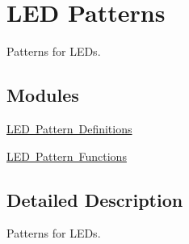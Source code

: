 \hypertarget{group___s_d___l_e_d___pattern}{}\section{L\+ED Patterns}
\label{group___s_d___l_e_d___pattern}


Patterns for L\+E\+Ds.  


\subsection*{Modules}
\begin{DoxyCompactItemize}
\item 
\mbox{\hyperlink{group___s_d___l_e_d___pattern___definitions}{L\+E\+D Pattern Definitions}}
\item 
\mbox{\hyperlink{group___s_d___l_e_d___pattern___functions}{L\+E\+D Pattern Functions}}
\end{DoxyCompactItemize}


\subsection{Detailed Description}
Patterns for L\+E\+Ds. 

